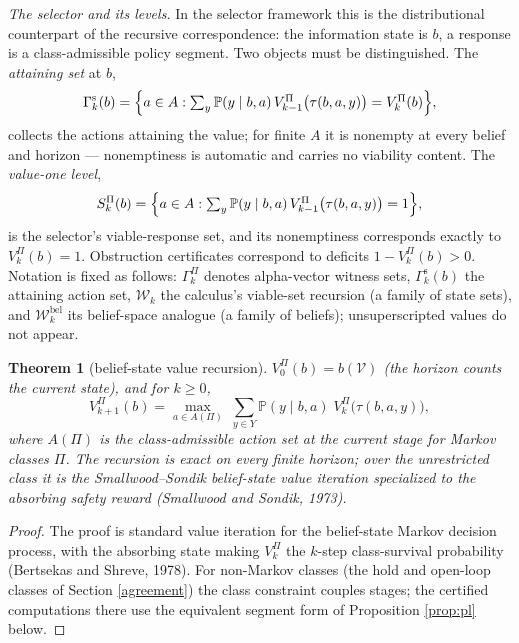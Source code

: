 \documentclass[10pt,twocolumn]{article}
\theoremstyle{plain}
\newtheorem{theorem}{Theorem}
\theoremstyle{definition}
\theoremstyle{remark}
\begin{document}
\emph{The selector and its levels.} In the selector framework this is the
distributional counterpart of the recursive correspondence: the
information state is \(b\), a response is a class-admissible policy
segment. Two objects must be distinguished. The \emph{attaining set} at
\(b\),
\[
\Gamma^{\mathrm{s}}_{k}(b) = \Bigl\{ a \in A : \textstyle\sum_{y}
\mathbb{P}(y \mid b, a)\, V^{\Pi}_{k-1}\bigl(\tau(b, a, y)\bigr)
= V^{\Pi}_{k}(b) \Bigr\},
\]
collects the actions attaining the value; for finite \(A\) it is nonempty
at every belief and horizon --- nonemptiness is automatic and carries no
viability content. The \emph{value-one level},
\[
S^{\Pi}_{k}(b) = \Bigl\{ a \in A : \textstyle\sum_{y} \mathbb{P}(y \mid
b, a)\, V^{\Pi}_{k-1}\bigl(\tau(b, a, y)\bigr) = 1 \Bigr\},
\]
is the selector's viable-response set, and its nonemptiness corresponds
exactly to \(V^{\Pi}_{k}(b) = 1\). Obstruction certificates correspond to
deficits \(1 - V^{\Pi}_{k}(b) > 0\). Notation is fixed as follows:
\(\Gamma^{\Pi}_{k}\) denotes alpha-vector witness sets,
\(\Gamma^{\mathrm{s}}_{k}(b)\) the attaining action set,
\(\mathcal{W}_{k}\) the calculus's viable-set recursion (a family of
state sets), and \(\mathcal{W}^{\mathrm{bel}}_{k}\) its belief-space
analogue (a family of beliefs); unsuperscripted values do not appear.

\begin{theorem}[belief-state value recursion]\label{thm:recursion}
\(V^{\Pi}_{0}(b) = b(\mathcal{V})\) (the horizon counts the current
state), and for \(k \ge 0\),
\[
V^{\Pi}_{k+1}(b) = \max_{a \in A(\Pi)}\; \sum_{y \in Y} \mathbb{P}(y \mid
b, a)\; V^{\Pi}_{k}\bigl(\tau(b, a, y)\bigr),
\]
where \(A(\Pi)\) is the class-admissible action set at the current stage
for Markov classes \(\Pi\). The recursion is exact on every finite
horizon; over the unrestricted class it is the Smallwood--Sondik
belief-state value iteration specialized to the absorbing safety reward
(Smallwood and Sondik, 1973).
\end{theorem}

\begin{proof}
The proof is standard value iteration for the belief-state Markov decision
process, with the absorbing state making \(V^{\Pi}_{k}\) the \(k\)-step
class-survival probability (Bertsekas and Shreve, 1978). For non-Markov
classes (the hold and open-loop classes of Section \ref{agreement}) the
class constraint couples stages; the certified computations there use the
equivalent segment form of Proposition \ref{prop:pl} below.
\end{proof}
\end{document}
